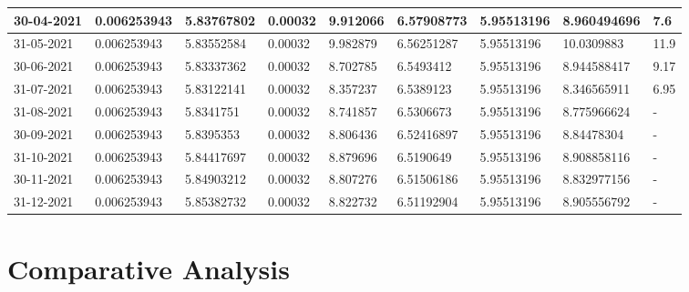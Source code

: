\documentclass[times,twocolumn,final,authoryear]{elsarticle}
\begin{document}
\begin{table}[t]
{\begin{tabular}{|l|l|l|l|l|l|l|l|l|}
				30-04-2021    & 0.006253943    & 5.83767802       & 0.00032         & 9.912066         & 6.57908773    & 5.95513196   & 8.960494696           & 7.6               \\ \hline
				31-05-2021    & 0.006253943    & 5.83552584       & 0.00032         & 9.982879         & 6.56251287    & 5.95513196   & 10.0309883            & 11.9              \\ \hline
				30-06-2021    & 0.006253943    & 5.83337362       & 0.00032         & 8.702785         & 6.5493412     & 5.95513196   & 8.944588417           & 9.17              \\ \hline
				31-07-2021    & 0.006253943    & 5.83122141       & 0.00032         & 8.357237         & 6.5389123     & 5.95513196   & 8.346565911           & 6.95              \\ \hline
				31-08-2021    & 0.006253943    & 5.8341751        & 0.00032         & 8.741857         & 6.5306673     & 5.95513196   & 8.775966624           & -                 \\ \hline
				30-09-2021    & 0.006253943    & 5.8395353        & 0.00032         & 8.806436         & 6.52416897    & 5.95513196   & 8.84478304            & -                 \\ \hline
				31-10-2021    & 0.006253943    & 5.84417697       & 0.00032         & 8.879696         & 6.5190649     & 5.95513196   & 8.908858116           & -                 \\ \hline
				30-11-2021    & 0.006253943    & 5.84903212       & 0.00032         & 8.807276         & 6.51506186    & 5.95513196   & 8.832977156           & -                 \\ \hline
				31-12-2021    & 0.006253943    & 5.85382732       & 0.00032         & 8.822732         & 6.51192904    & 5.95513196   & 8.905556792           & -                 \\ \hline
			\end{tabular}}
	\end{table}
	
	
	\section{Comparative Analysis}\label{Sec_Comp}
\end{document}
